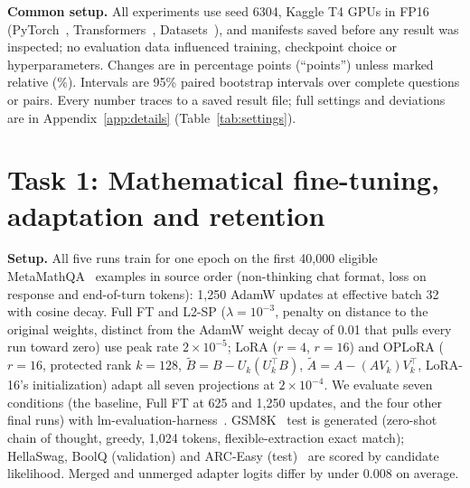 \documentclass{article}
\begin{document}
\textbf{Common setup.} All experiments use seed 6304, Kaggle T4 GPUs in FP16 (PyTorch~\cite{paszke2019pytorch}, Transformers~\cite{wolf2020transformers}, Datasets~\cite{lhoest2021datasets}), and manifests saved before any result was inspected; no evaluation data influenced training, checkpoint choice or hyperparameters. Changes are in percentage points (``points'') unless marked relative (\%). Intervals are 95\% paired bootstrap intervals over complete questions or pairs. Every number traces to a saved result file; full settings and deviations are in Appendix~\ref{app:details} (Table~\ref{tab:settings}).

\section{Task 1: Mathematical fine-tuning, adaptation and retention}

\textbf{Setup.} All five runs train for one epoch on the first 40,000 eligible MetaMathQA~\cite{yu2024metamath} examples in source order (non-thinking chat format, loss on response and end-of-turn tokens): 1,250 AdamW updates at effective batch 32 with cosine decay. Full FT and L2-SP ($\lambda=10^{-3}$, penalty on distance to the original weights, distinct from the AdamW weight decay of 0.01 that pulls every run toward zero) use peak rate $2\times10^{-5}$; LoRA ($r{=}4$, $r{=}16$) and OPLoRA ($r{=}16$, protected rank $k{=}128$, $\tilde B=B-U_k(U_k^\top B)$, $\tilde A=A-(AV_k)V_k^\top$, LoRA-16's initialization) adapt all seven projections at $2\times10^{-4}$. We evaluate seven conditions (the baseline, Full FT at 625 and 1,250 updates, and the four other final runs) with lm-evaluation-harness~\cite{eval-harness}. GSM8K~\cite{cobbe2021gsm8k} test is generated (zero-shot chain of thought, greedy, 1,024 tokens, flexible-extraction exact match); HellaSwag, BoolQ (validation) and ARC-Easy (test)~\cite{zellers2019hellaswag,clark2019boolq,clark2018arc} are scored by candidate likelihood. Merged and unmerged adapter logits differ by under 0.008 on average.
\end{document}
